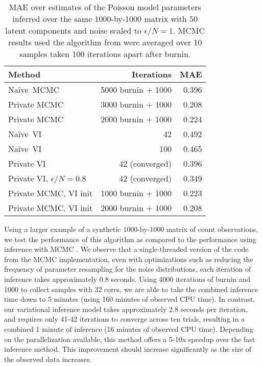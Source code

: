 \documentclass{article}
\newcommand{\Naive}{Na\"{i}ve}
\begin{document}
  \begin{table}[h]
    \center
    \small
    \begin{tabular}{|l|r|r|}
      \hline
      Method & Iterations & MAE \\
      \hline
      \Naive~MCMC & 5000 burnin + 1000 & 0.396 \\
      Private MCMC & 3000 burnin + 1000 & 0.208 \\
      Private MCMC & 2000 burnin + 1000 & 0.224 \\
      \hline 
      \Naive~VI & 42 & 0.492 \\
      \Naive~VI & 100 & 0.465 \\
      Private VI & 42 (converged) & 0.396 \\
      Private VI, $\epsilon/N = 0.8$ & 42 (converged) & 0.349 \\
      \hline
      Private MCMC, VI init & 1000 burnin + 1000 & 0.223 \\
      Private MCMC, VI init & 2000 burnin + 1000 & 0.208 \\
      \hline
    \end{tabular}
    \caption{MAE over estimates of the Poisson model parameters inferred over the
    same 1000-by-1000 matrix with 50 latent components and noise scaled to $\epsilon/N = 1$. MCMC results used the algorithm from \cite{schein2018locally} were averaged over 10 samples taken 100 iterations apart after burnin.}
    \label{tab:results_synth}
  \end{table}

  Using a larger example of a synthetic 1000-by-1000 matrix of count
  observations, we test the performance of this algorithm as compared to the
  performance using inference with MCMC \citep{schein2018locally}. We observe
  that a single-threaded version of the code from the MCMC implementation, even
  with optimizations such as reducing the frequency of parameter resampling for
  the noise distributions, each iteration of inference takes approximately 0.8
  seconds. Using 4000 iterations of burnin and 1000 to collect samples with 32
  cores, we are able to take the combined inference time down to 5 minutes
  (using 160 minutes of observed CPU time). In contrast, our variational
  inference model takes approximately 2.8 seconds per iteration, and requires
  only 41-42 iterations to converge across ten trials, resulting in a combined 1
  minute of inference (16 minutes of observed CPU time). Depending on the
  parallelization available, this method offers a 5-10x speedup over the fast
  inference method. This improvement should increase significantly as the size
  of the observed data increases.
\end{document}
